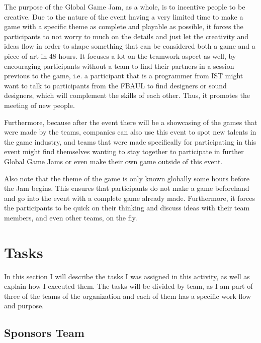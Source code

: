 \documentclass[a4paper,12pt,journal,twoside,compsoc]{PPIEEEtran}
\begin{document}
The purpose of the Global Game Jam, as a whole, is to incentive people to be creative. Due to the nature of the event having a very limited time to make a game with a specific theme as complete and playable as possible, it forces the participants to not worry to much on the details and just let the creativity and ideas flow in order to shape something that can be considered both a game and a piece of art in 48 hours. It focuses a lot on the teamwork aspect as well, by encouraging participants without a team to find their partners in a session previous to the game, i.e. a participant that is a programmer from IST might want to talk to participants from the \ac{FBAUL} to find designers or sound designers, which will complement the skills of each other. Thus, it promotes the meeting of new people.

Furthermore, because after the event there will be a showcasing of the games that were made by the teams, companies can also use this event to spot new talents in the game industry, and teams that were made specifically for participating in this event might find themselves wanting to stay together to participate in further Global Game Jams or even make their own game outside of this event.

Also note that the theme of the game is only known globally some hours before the Jam begins. This ensures that participants do not make a game beforehand and go into the event with a complete game already made. Furthermore, it forces the participants to be quick on their thinking and discuss ideas with their team members, and even other teams, on the fly. 

\section{Tasks}
\label{tasks}

In this section I will describe the tasks I was assigned in this activity, as well as explain how I executed them. The tasks will be divided by team, as I am part of three of the teams of the organization and each of them has a specific work flow and purpose.

\subsection{Sponsors Team}
\end{document}
